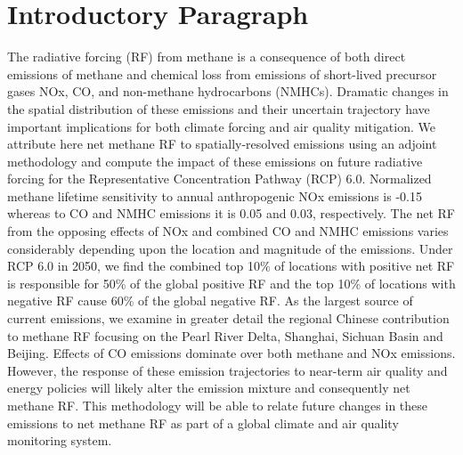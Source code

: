 \section*{Introductory Paragraph}

The radiative forcing (RF) from methane is a consequence of both direct emissions of methane and chemical loss from emissions of short-lived precursor gases NOx, CO, and non-methane hydrocarbons (NMHCs). Dramatic changes in the spatial distribution of these emissions and their uncertain trajectory have important implications for both climate forcing and air quality mitigation.  We attribute here net methane RF  to spatially-resolved emissions using an adjoint methodology and compute the impact of these emissions on future radiative forcing for the Representative Concentration Pathway (RCP) 6.0.  Normalized methane lifetime sensitivity to annual anthropogenic NOx emissions is -0.15 whereas to CO and NMHC emissions it is 0.05 and 0.03, respectively. The net RF from the opposing effects of NOx and combined CO and NMHC emissions varies considerably depending upon the location and magnitude of the emissions.  Under RCP 6.0 in 2050,  we find the combined top 10\% of locations with positive net RF is responsible for 50\% of the global positive RF and the top 10\% of locations with negative RF cause 60\% of the global negative RF. As the largest source of current emissions, we examine in greater detail the regional Chinese contribution to methane RF focusing on the Pearl River Delta, Shanghai, Sichuan Basin and Beijing. Effects of CO emissions dominate over both methane and NOx emissions. However, the response of these emission trajectories to near-term air quality and energy policies will likely alter the emission mixture and consequently net methane RF. This methodology will be able to relate future changes in these emissions to net methane RF as part of a global climate and air quality monitoring system. 